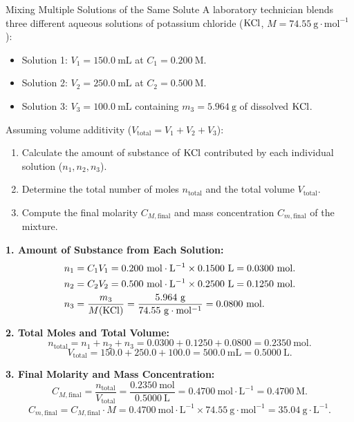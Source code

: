 \begin{exercise}{Mixing Multiple Solutions of the Same Solute}
A laboratory technician blends three different aqueous solutions of potassium chloride ($\ce{KCl}$, $M = 74.55\ \mathrm{g\cdot mol^{-1}}$):
\begin{itemize}[itemsep=1pt]
  \item Solution 1: $V_1 = 150.0\ \mathrm{mL}$ at $C_1 = 0.200\ \mathrm{M}$.
  \item Solution 2: $V_2 = 250.0\ \mathrm{mL}$ at $C_2 = 0.500\ \mathrm{M}$.
  \item Solution 3: $V_3 = 100.0\ \mathrm{mL}$ containing $m_3 = 5.964\ \mathrm{g}$ of dissolved $\ce{KCl}$.
\end{itemize}
Assuming volume additivity ($V_{\text{total}} = V_1 + V_2 + V_3$):
\begin{enumerate}[leftmargin=1.5em,itemsep=2pt]
  \item Calculate the amount of substance of $\ce{KCl}$ contributed by each individual solution ($n_1, n_2, n_3$).
  \item Determine the total number of moles $n_{\text{total}}$ and the total volume $V_{\text{total}}$.
  \item Compute the final molarity $C_{M,\text{final}}$ and mass concentration $C_{m,\text{final}}$ of the mixture.
\end{enumerate}
\end{exercise}

\begin{tabletworkspace}[5.0cm]
\end{tabletworkspace}

\begin{solution}
\textbf{1. Amount of Substance from Each Solution:}
\begin{align*}
n_1 &= C_1 V_1 = 0.200\ \mathrm{mol\cdot L^{-1}} \times 0.1500\ \mathrm{L} = 0.0300\ \mathrm{mol}. \\
n_2 &= C_2 V_2 = 0.500\ \mathrm{mol\cdot L^{-1}} \times 0.2500\ \mathrm{L} = 0.1250\ \mathrm{mol}. \\
n_3 &= \frac{m_3}{M(\ce{KCl})} = \frac{5.964\ \mathrm{g}}{74.55\ \mathrm{g\cdot mol^{-1}}} = 0.0800\ \mathrm{mol}.
\end{align*}

\textbf{2. Total Moles and Total Volume:}
\[
n_{\text{total}} = n_1 + n_2 + n_3 = 0.0300 + 0.1250 + 0.0800 = \mathbf{0.2350\ \mathrm{mol}}.
\]
\[
V_{\text{total}} = 150.0 + 250.0 + 100.0 = 500.0\ \mathrm{mL} = \mathbf{0.5000\ \mathrm{L}}.
\]

\textbf{3. Final Molarity and Mass Concentration:}
\[
C_{M,\text{final}} = \frac{n_{\text{total}}}{V_{\text{total}}} = \frac{0.2350\ \mathrm{mol}}{0.5000\ \mathrm{L}} = \mathbf{0.4700\ \mathrm{mol\cdot L^{-1}} = 0.4700\ \mathrm{M}}.
\]
\[
C_{m,\text{final}} = C_{M,\text{final}} \cdot M = 0.4700\ \mathrm{mol\cdot L^{-1}} \times 74.55\ \mathrm{g\cdot mol^{-1}} = \mathbf{35.04\ \mathrm{g\cdot L^{-1}}}.
\]
\end{solution}

